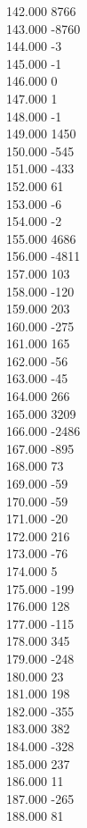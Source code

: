 { 142.000	8766 \\
 143.000	-8760 \\
 144.000	-3 \\
 145.000	-1 \\
 146.000	0 \\
 147.000	1 \\
 148.000	-1 \\
 149.000	1450 \\
 150.000	-545 \\
 151.000	-433 \\
 152.000	61 \\
 153.000	-6 \\
 154.000	-2 \\
 155.000	4686 \\
 156.000	-4811 \\
 157.000	103 \\
 158.000	-120 \\
 159.000	203 \\
 160.000	-275 \\
 161.000	165 \\
 162.000	-56 \\
 163.000	-45 \\
 164.000	266 \\
 165.000	3209 \\
 166.000	-2486 \\
 167.000	-895 \\
 168.000	73 \\
 169.000	-59 \\
 170.000	-59 \\
 171.000	-20 \\
 172.000	216 \\
 173.000	-76 \\
 174.000	5 \\
 175.000	-199 \\
 176.000	128 \\
 177.000	-115 \\
 178.000	345 \\
 179.000	-248 \\
 180.000	23 \\
 181.000	198 \\
 182.000	-355 \\
 183.000	382 \\
 184.000	-328 \\
 185.000	237 \\
 186.000	11 \\
 187.000	-265 \\
 188.000	81 \\
}

